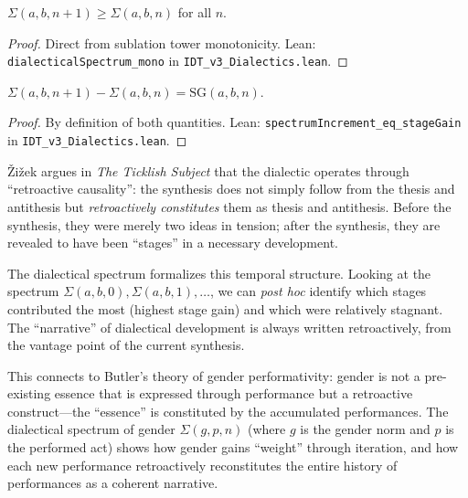 \begin{theorem}
\label{thm:spectrum-mono}
$\Sigma(a, b, n+1) \geq \Sigma(a, b, n)$ for all $n$.
\end{theorem}

\begin{proof}
Direct from sublation tower monotonicity.
Lean: \texttt{dialecticalSpectrum\_mono} in \texttt{IDT\_v3\_Dialectics.lean}.
\end{proof}

\begin{theorem}
\label{thm:spectrum-stage-gain}
$\Sigma(a, b, n+1) - \Sigma(a, b, n) = \mathrm{SG}(a, b, n)$.
\end{theorem}

\begin{proof}
By definition of both quantities.
Lean: \texttt{spectrumIncrement\_eq\_stageGain} in
\texttt{IDT\_v3\_Dialectics.lean}.
\end{proof}

\begin{remark}
\v{Z}i\v{z}ek argues in \textit{The Ticklish Subject} that the dialectic
operates through ``retroactive causality'': the synthesis does not simply
follow from the thesis and antithesis but \emph{retroactively constitutes}
them as thesis and antithesis. Before the synthesis, they were merely two
ideas in tension; after the synthesis, they are revealed to have been
``stages'' in a necessary development.

The dialectical spectrum formalizes this temporal structure. Looking at the
spectrum $\Sigma(a, b, 0), \Sigma(a, b, 1), \ldots$, we can \emph{post hoc}
identify which stages contributed the most (highest stage gain) and which
were relatively stagnant. The ``narrative'' of dialectical development is
always written retroactively, from the vantage point of the current synthesis.

This connects to Butler's theory of gender performativity: gender is not a
pre-existing essence that is expressed through performance but a
retroactive construct---the ``essence'' is constituted by the accumulated
performances. The dialectical spectrum of gender $\Sigma(g, p, n)$ (where
$g$ is the gender norm and $p$ is the performed act) shows how gender gains
``weight'' through iteration, and how each new performance retroactively
reconstitutes the entire history of performances as a coherent narrative.
\end{remark}


